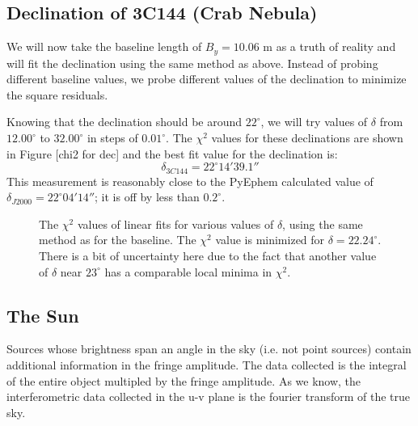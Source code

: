 \documentclass[12pt]{article}
\begin{document}
\subsection{Declination of 3C144 (Crab Nebula)}
We will now take the baseline length of $B_y = 10.06$ m as a truth of reality and will fit the declination using the same method as above. Instead of probing different baseline values, we probe different values of the declination to minimize the square residuals.

Knowing that the declination should be around $22^\circ$, we will try values of $\delta$ from $12.00^\circ$ to $32.00^\circ$ in steps of $0.01^\circ$. The $\chi^2$ values for these declinations are shown in Figure [chi2 for dec] and the best fit value for the declination is:
\begin{equation}
\delta_{3C144} = 22^\circ 14'39.1''
\end{equation}
This measurement is reasonably close to the PyEphem calculated value of $\delta_{J2000} = 22^\circ 04'14'' $; it is off by less than $0.2^\circ$. 

\begin{figure}[H]
\caption[SODUMB]{The $\chi^2$ values of linear fits for various values of $\delta$, using the same method as for the baseline. The $\chi^2$ value is minimized for $\delta = 22.24^\circ$. There is a bit of uncertainty here due to the fact that another value of $\delta$ near $23^\circ$ has a comparable local minima in $\chi^2$.}
\label{fig:dec-chi2}
\end{figure}

\subsection{The Sun}
Sources whose brightness span an angle in the sky (i.e. not point sources) contain additional information in the fringe amplitude. The data collected is the integral of the entire object multipled by the fringe amplitude. As we know, the interferometric data collected in the u-v plane is the fourier transform of the true sky.
\end{document}
